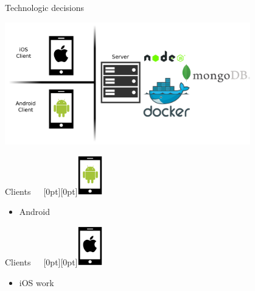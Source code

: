 \documentclass[11pt]{beamer}
\begin{document}
\begin{frame}{Technologic decisions}

  \begin{center}
    \includegraphics[width=0.8\textwidth]{tech-stack-big-picture}
  \end{center}


\end{frame}

\begin{frame}{Clients~~~\raisebox{-10pt}[0pt][0pt]{\includegraphics[width=0.08\textwidth]{tech-stack-android}}}

  \begin{itemize}
    \item Android
  \end{itemize}

\end{frame}

\begin{frame}{Clients~~~\raisebox{-10pt}[0pt][0pt]{\includegraphics[width=0.08\textwidth]{tech-stack-apple}}}

  \begin{itemize}
    \item iOS work
  \end{itemize}

\end{frame}
\end{document}
